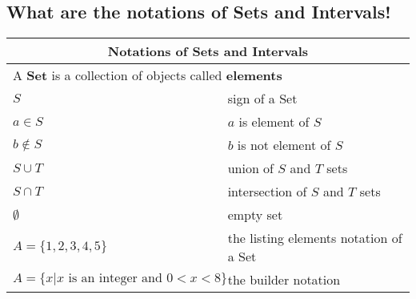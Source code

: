 \subsection{What are the notations of Sets and Intervals!}

\begin{small}
\begin{tabularx}{1\textwidth}{
        p{}
        p{}
    }
    \toprule
    \multicolumn{2}{c}{\textbf{Notations of Sets and Intervals}} \\
    \midrule
    \multicolumn{2}{l}{
        A \textbf{Set} is a collection of objects called \textbf{elements}
    } \\
    \midrule
    $S$ & sign of a Set \\
    \midrule
    $a \in S$ & $a$ is element of $S$ \\
    \midrule
    $b \notin S$  & $b$ is not element of $S$ \\
    \midrule
    $S \cup T$  & union of $S$ and $T$ sets \\
    \midrule
    $S \cap T$ & intersection of $S$ and $T$ sets \\
    \midrule
    $\emptyset$ & empty set \\
    \midrule
    $A = \{1, 2, 3, 4, 5\}$ & the listing elements notation of a Set \\
    \midrule
    $ A = \{x | x \text{ is an integer and } 0 < x < 8 \}$ &
    the builder notation \\
    \bottomrule
\end{tabularx}
\end{small}
